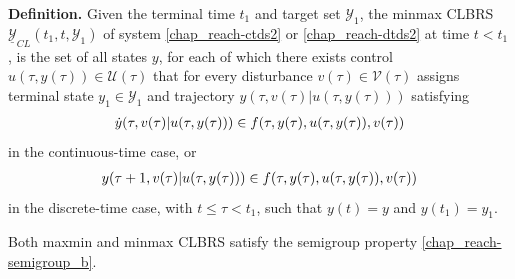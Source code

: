 \documentclass[letterpaper,10pt,english]{sphinxmanual}
\begin{document}
\textbf{Definition.} Given the terminal time \(t_1\) and target set \({\mathcal Y}_1\), the
minmax CLBRS \(\underline{{\mathcal Y}}_{CL}(t_1, t, {\mathcal Y}_1)\) of system
\eqref{chap_reach-ctds2} or \eqref{chap_reach-dtds2} at time \(t<t_1\), is the set of all states
\(y\), for each of which there exists control
\(u(\tau, y(\tau))\in{\mathcal U}(\tau)\) that for every disturbance
\(v(\tau)\in{\mathcal V}(\tau)\) assigns terminal state
\(y_1\in{\mathcal Y}_1\) and trajectory
\(y(\tau, v(\tau) | u(\tau, y(\tau)))\) satisfying
\begin{gather}
\begin{split}\dot{y}(\tau, v(\tau) | u(\tau, y(\tau))) \in
f(\tau, y(\tau), u(\tau, y(\tau)), v(\tau))\end{split}\notag
\end{gather}
in the continuous-time case, or
\begin{gather}
\begin{split}y(\tau+1, v(\tau) | u(\tau, y(\tau))) \in
f(\tau, y(\tau), u(\tau, y(\tau)), v(\tau))\end{split}\notag
\end{gather}
in the discrete-time case, with \(t\leqslant\tau<t_1\), such that
\(y(t) = y\) and \(y(t_1)=y_1\).

Both
maxmin and minmax CLBRS satisfy the semigroup property
\eqref{chap_reach-semigroup_b}.
\end{document}
